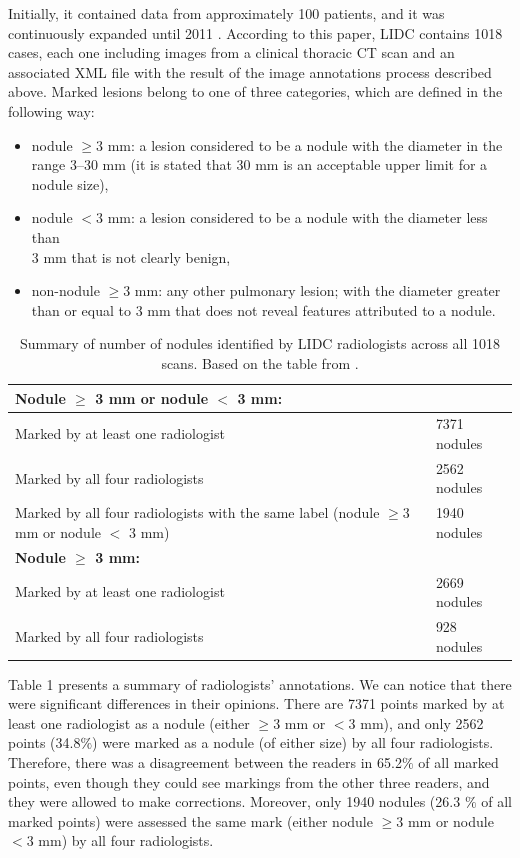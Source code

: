 \documentclass[12pt]{article}
\begin{document}
Initially, it contained data from approximately 100 patients, and it was continuously expanded until 2011 \citep{armato2011lung}. According to this paper, LIDC contains 1018 cases, each one including images from a clinical thoracic CT scan and an associated XML file with the result of the image annotations process described above. Marked lesions belong to one of three categories, which are defined in the following way: 
\begin{itemize}
    \item nodule $\geq 3 $ mm: a lesion considered to be a nodule with the diameter in the range 3–30 mm (it is stated that 30 mm is an acceptable upper limit for a nodule size),
    \item  nodule $< 3$ mm: a lesion considered to be a nodule with the diameter less than \\3 mm that is not clearly benign,
    \item non-nodule $\geq 3$ mm: any other pulmonary lesion; with the diameter greater than or equal to 3 mm that does not reveal features attributed to a nodule.
\end{itemize}


\begin {table}
\caption {Summary of number of nodules identified by LIDC radiologists across all 1018 scans. Based on the table from \citep{armato2011lung}. } \label{tab:title} 
\begin{center}
\begin{tabular}{ | m{8cm} |  m{3.5cm} | } 
\hline
\textbf{Nodule $\pmb{\geq }$ 3 mm  or nodule $\pmb{ <}$ 3 mm:} & \\
\hline
Marked by at least one radiologist & 7371 nodules \\
Marked by all four radiologists & 2562 nodules\\
Marked by all four radiologists with the same label (nodule $\geq 3 $ mm  or nodule $ <$ 3 mm) & 1940 nodules\\
\hline
\textbf{Nodule $\pmb{\geq }$ 3 mm:} &\\
\hline
Marked by at least one radiologist & 2669 nodules\\
Marked by all four radiologists & 928 nodules\\
\hline

\end{tabular}
\end{center}
\end{table}

Table 1 presents a summary of radiologists' annotations. We can notice that there were significant differences in their opinions. There are 7371 points marked by at least one radiologist as a nodule (either $\geq 3$ mm or $< 3$ mm), and only 2562 points (34.8$\%$) were marked as a nodule (of either size) by all four radiologists. Therefore, there was a disagreement between the readers in 65.2$\%$ of all marked points, even though they could see markings from the other three readers, and they were allowed to make corrections. Moreover, only 1940 nodules  (26.3 $\%$ of all marked points) were assessed the same mark (either nodule $\geq 3 $ mm or nodule$< 3$ mm) by all four radiologists.   
\end{document}
